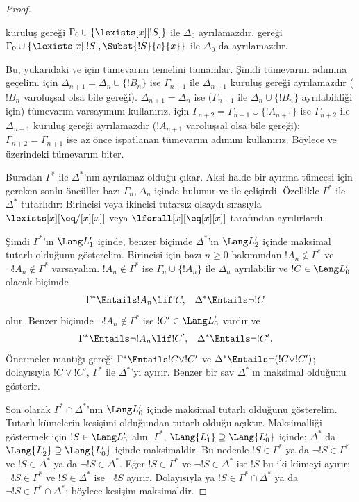 \begin{proof}
\begin{enumerate}
  kuruluş gereği $\Gamma_0\cup\{\lexists[x][!S]\}$ ile $\Delta_0$
  ayrılamazdır.  gereği
  $\Gamma_0\cup\{\lexists[x][!S],\Subst{!S}{c}{x}\}$ ile
  $\Delta_0$ da ayrılamazdır.
\end{enumerate}
Bu, yukarıdaki  ve  için tümevarım temelini
tamamlar. Şimdi tümevarım adımına geçelim.  için
$\Delta_{n+1}=\Delta_n\cup\{!B_n\}$ ise $\Gamma_{n+1}$ ile
$\Delta_{n+1}$ kuruluş gereği ayrılamazdır ($!B_n$ varoluşsal olsa
bile  gereği). $\Delta_{n+1}=\Delta_n$ ise
($\Gamma_{n+1}$ ile $\Delta_n\cup\{!B_n\}$ ayrılabildiği için)
 tümevarım varsayımını kullanırız.  için
$\Gamma_{n+2}=\Gamma_{n+1}\cup\{!A_{n+1}\}$ ise $\Gamma_{n+2}$ ile
$\Delta_{n+1}$ kuruluş gereği ayrılamazdır ($!A_{n+1}$ varoluşsal
olsa bile  gereği); $\Gamma_{n+2}=\Gamma_{n+1}$
ise az önce ispatlanan  tümevarım adımını kullanırız.
Böylece  ve  üzerindeki tümevarım biter.

Buradan $\Gamma^*$ ile $\Delta^*$'nın ayrılamaz olduğu çıkar. Aksi
halde bir ayırma tümcesi için gereken sonlu öncüller bazı
$\Gamma_n,\Delta_n$ içinde bulunur ve  ile çelişirdi.
Özellikle $\Gamma^*$ ile $\Delta^*$ tutarlıdır: Birincisi veya ikincisi
tutarsız olsaydı sırasıyla $\lexists[x][\eq/[x][x]]$ veya
$\lforall[x][\eq[x][x]]$ tarafından ayrılırlardı.

Şimdi $\Gamma^*$'ın $\Lang L'_1$ içinde, benzer biçimde $\Delta^*$'ın
$\Lang L'_2$ içinde maksimal tutarlı olduğunu gösterelim. Birincisi
için bazı $n\geq0$ bakımından $!A_n\notin\Gamma^*$ ve
$\lnot !A_n\notin\Gamma^*$ varsayalım. $!A_n\notin\Gamma^*$ ise
$\Gamma_n\cup\{!A_n\}$ ile $\Delta_n$ ayrılabilir ve
$!C\in\Lang L'_0$ olacak biçimde
\begin{align*}
  \Gamma^* & \Entails !A_n \lif !C, &
  \Delta^* & \Entails \lnot !C
\end{align*}
olur. Benzer biçimde $\lnot !A_n\notin\Gamma^*$ ise
$!C'\in\Lang L'_0$ vardır ve
\begin{align*}
  \Gamma^* & \Entails \lnot !A_n \lif !C', &
  \Delta^* & \Entails \lnot !C'.
\end{align*}
Önermeler mantığı gereği $\Gamma^*\Entails !C\lor !C'$ ve
$\Delta^*\Entails\lnot(!C\lor !C')$; dolayısıyla $!C\lor !C'$,
$\Gamma^*$ ile $\Delta^*$'yı ayırır. Benzer bir sav $\Delta^*$'ın
maksimal olduğunu gösterir.

Son olarak $\Gamma^*\cap\Delta^*$'nın $\Lang L'_0$ içinde maksimal
tutarlı olduğunu gösterelim. Tutarlı kümelerin kesişimi olduğundan
tutarlı olduğu açıktır. Maksimalliği göstermek için
$!S\in\Lang L'_0$ alın. $\Gamma^*$,
$\Lang{L'_1}\supseteq\Lang{L'_0}$ içinde; $\Delta^*$ da
$\Lang{L'_2}\supseteq\Lang{L'_0}$ içinde maksimaldir. Bu nedenle
$!S\in\Gamma^*$ ya da $\lnot !S\in\Gamma^*$ ve
$!S\in\Delta^*$ ya da $\lnot !S\in\Delta^*$. Eğer
$!S\in\Gamma^*$ ve $\lnot !S\in\Delta^*$ ise $!S$ bu iki kümeyi
ayırır; $\lnot !S\in\Gamma^*$ ve $!S\in\Delta^*$ ise $\lnot !S$
ayırır. Dolayısıyla ya $!S\in\Gamma^*\cap\Delta^*$ ya da
$\lnot !S\in\Gamma^*\cap\Delta^*$; böylece kesişim maksimaldir.


\end{proof}

